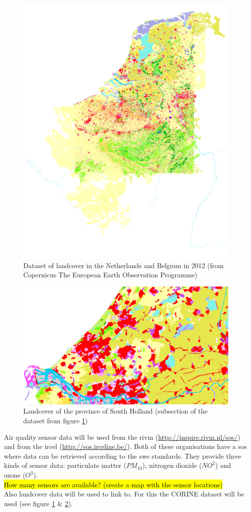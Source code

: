 \begin{figure}
	\centering
	\includegraphics[width=0.7\linewidth]{figs/CORINE_NL_BE_color.PNG}
	\caption{Dataset of landcover in the Netherlands and Belgium in 2012 (from Copernicus  The European Earth Observation Programme)}
	\label{fig:CORINE}
\end{figure}

\begin{figure}
	\centering
	\includegraphics[width=0.7\linewidth]{figs/CORINE_NL_BE_color_zoom.PNG}
	\caption{Landcover of the province of South Holland (subsection of the dataset from figure \ref{fig:CORINE})}
	\label{fig:CORINEZOOM}
\end{figure}

Air quality sensor data will be used from the \ac{rivm} (\url{http://inspire.rivm.nl/sos/}) and from the \ac{ircel} (\url{http://sos.irceline.be/}). Both of these organisations have a \ac{sos} where data can be retrieved according to the \ac{swe} standards. They provide three kinds of sensor data: particulate matter ($PM_{10}$), nitrogen dioxide ($NO^{2}$) and ozone ($O^{3}$).\\
\hl{How many sensors are available? (create a map with the sensor locations)}\\
Also landcover data will be used to link to. For this the CORINE dataset will be used (see figure \ref{fig:CORINE} \& \ref{fig:CORINEZOOM}). 

